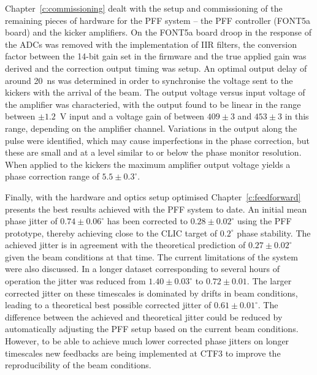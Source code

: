 Chapter~\ref{c:commissioning} dealt with the setup and commissioning of the remaining pieces of hardware for the PFF system -- the PFF controller (FONT5a board) and the kicker amplifiers. On the FONT5a board droop in the response of the ADCs was removed with the implementation of IIR filters, the conversion factor between the 14-bit gain set in the firmware and the true applied gain was derived and the correction output timing was setup. An optimal output delay of around 20~ns was determined in order to synchronise the voltage sent to the kickers with the arrival of the beam. The output voltage versus input voltage of the amplifier was characteried, with the output found to be linear in the range between \(\pm1.2\)~V input and a voltage gain of between \(409\pm3\) and \(453\pm3\) in this range, depending on the amplifier channel. Variations in the output along the pulse were identified, which may cause imperfections in the phase correction, but these are small and at a level similar to or below the phase monitor resolution. When applied to the kickers the maximum amplifier output voltage yields a phase correction range of \(5.5\pm0.3^\circ\).

Finally, with the hardware and optics setup optimised Chapter~\ref{c:feedforward} presents the best results achieved with the PFF system to date. An initial mean phase jitter of \(0.74\pm0.06^\circ\) has been corrected to \(0.28\pm0.02^\circ\) using the PFF prototype, thereby achieving close to the CLIC target of \(0.2^\circ\) phase stability. The achieved jitter is in agreement with the theoretical prediction of \(0.27\pm0.02^\circ\) given the beam conditions at that time. The current limitations of the system were also discussed. In a longer dataset corresponding to several hours of operation the jitter was reduced from \(1.40\pm0.03^\circ\) to \(0.72\pm0.01\). The larger corrected jitter on these timescales is dominated by drifts in beam conditions, leading to a theoretical best possible corrected jitter of \(0.61\pm0.01^\circ\). The difference between the achieved and theoretical jitter could be reduced by automatically adjusting the PFF setup based on the current beam conditions. However, to be able to achieve much lower corrected phase jitters on longer timescales new feedbacks are being implemented at CTF3 to improve the reproducibility of the beam conditions. 


